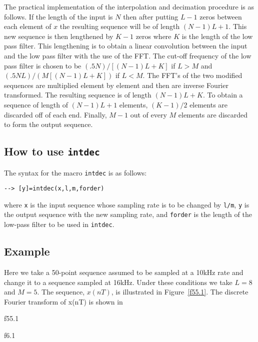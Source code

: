 	The practical implementation of the interpolation and decimation
procedure is as follows.
If the length of the input is $N$ then after putting $L-1$ zeros
between each element of $x$ the resulting sequence will be of length
$(N-1)L+1$.  This new sequence is then lengthened by $K-1$ zeros
where $K$ is the length of the low pass filter.  This lengthening is
to obtain a linear convolution between the input and the low pass
filter with the use of the FFT.  The cut-off frequency
of the low pass filter is chosen to be $(.5N)/[(N-1)L+K]$ if $L>M$
and $(.5NL)/(M[(N-1)L+K])$ if $L<M$.  
The FFT's of the two modified sequences are multiplied
element by element and then are inverse Fourier transformed.
The resulting sequence is of length $(N-1)L+K$.  To obtain a
sequence of length of $(N-1)L+1$ elements, $(K-1)/2$ elements
are discarded off of each end.  Finally, $M-1$ out of every
$M$ elements are discarded to form the output sequence.

\subsection{How to use {\tt intdec}}
\label{s4.1}

	The syntax for the macro {\tt intdec} is as follows:
\begin{verbatim}
--> [y]=intdec(x,l,m,forder)
\end{verbatim}
where {\tt x} is the input sequence  
whose sampling rate is to be changed by
{\tt l/m}, {\tt y} is the output sequence with the new sampling rate, and 
{\tt forder} is the length of the low-pass filter to be used in {\tt intdec}.
 
\subsection{Example}

	Here we take a 50-point sequence assumed to be sampled at
a 10kHz rate and change it to a sequence sampled at 16kHz.  Under
these conditions we take $L=8$ and $M=5$.
The sequence, $x(nT)$, is illustrated
in Figure~\ref{f55.1}.  The discrete Fourier transform of x(nT) is shown in
%

{f55.1}

%
%

{f6.1}

